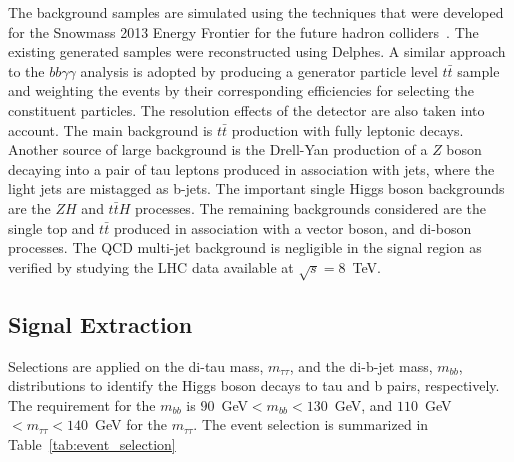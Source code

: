The background samples are simulated using the techniques that were developed for the Snowmass 2013 Energy Frontier for the future hadron colliders~\cite{Avetisyan}. The existing generated samples were reconstructed using Delphes. A similar approach to the $bb\gamma\gamma$ analysis is adopted by producing a generator particle level $t\bar{t}$ sample and weighting the events by their corresponding efficiencies for selecting the constituent particles. The resolution effects of the detector are also taken into account. The main background is $t\bar{t}$ production with fully leptonic decays. Another source of large background is the Drell-Yan
production of a $Z$ boson decaying into a pair of tau leptons
produced in association with jets, where the light jets are mistagged as b-jets. The important single Higgs boson backgrounds are the $ZH$ and  $t\bar{t}H$ processes. The remaining backgrounds considered are the single top and $t\bar{t}$ produced in association with a vector boson, and di-boson processes.
The QCD multi-jet background is negligible in the signal region as verified by studying the LHC data available at $\sqrt{s} = 8$~TeV. 

\subsection {Signal Extraction}
 Selections are applied on the di-tau mass, $m_{\tau\tau}$, and the di-b-jet mass, $m_{bb}$, distributions to identify
the Higgs boson decays to tau and b pairs, respectively. The requirement for the $m_{bb}$ is $90$~GeV$<m_{bb}<130$~GeV, and
$110$~GeV$<m_{\tau\tau}<140$~GeV for the $m_{\tau\tau}$. The event selection is summarized in Table~\ref{tab:event_selection} 

\begin{table}[!ht]
\begin{center} 
\caption{ Event selection summary for the bb$\tau\tau$ final state.}
\label{tab:event_selection}
\end{center}
\end{table}

